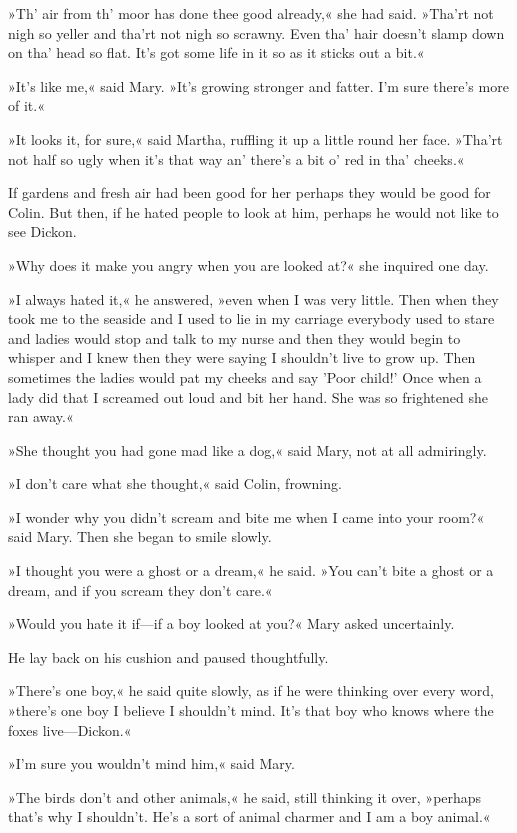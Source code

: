 »Th' air from th' moor has done thee good already,« she had said. »Tha'rt not nigh so yeller and tha'rt not nigh so scrawny. Even tha' hair doesn't slamp down on tha' head so flat. It's got some life in it so as it sticks out a bit.«

»It's like me,« said Mary. »It's growing stronger and fatter. I'm sure there's more of it.«

»It looks it, for sure,« said Martha, ruffling it up a little round her face. »Tha'rt not half so ugly when it's that way an' there's a bit o' red in tha' cheeks.«

If gardens and fresh air had been good for her perhaps they would be good for Colin. But then, if he hated people to look at him, perhaps he would not like to see Dickon.

»Why does it make you angry when you are looked at?« she inquired one day.

»I always hated it,« he answered, »even when I was very little. Then when they took me to the seaside and I used to lie in my carriage everybody used to stare and ladies would stop and talk to my nurse and then they would begin to whisper and I knew then they were saying I shouldn't live to grow up. Then sometimes the ladies would pat my cheeks and say 'Poor child!' Once when a lady did that I screamed out loud and bit her hand. She was so frightened she ran away.«

»She thought you had gone mad like a dog,« said Mary, not at all admiringly.

»I don't care what she thought,« said Colin, frowning.

»I wonder why you didn't scream and bite me when I came into your room?« said Mary. Then she began to smile slowly.

»I thought you were a ghost or a dream,« he said. »You can't bite a ghost or a dream, and if you scream they don't care.«

»Would you hate it if—if a boy looked at you?« Mary asked uncertainly.

He lay back on his cushion and paused thoughtfully.

»There's one boy,« he said quite slowly, as if he were thinking over every word, »there's one boy I believe I shouldn't mind. It's that boy who knows where the foxes live—Dickon.«

»I'm sure you wouldn't mind him,« said Mary.

»The birds don't and other animals,« he said, still thinking it over, »perhaps that's why I shouldn't. He's a sort of animal charmer and I am a boy animal.«

